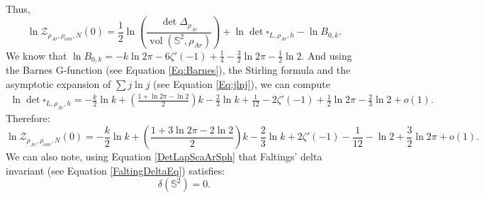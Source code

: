 \documentclass{article}
\theoremstyle{definition}
\theoremstyle{remark}
\DeclareMathOperator{\vol}{vol}
\begin{document}
Thus, \begin{equation}
    \ln \mathcal{Z}_{\rho_{Ar},\rho_{can},N}(0)=\frac{1}{2}\ln\left(\frac{\det \Delta_{\rho_{Ar}}}{\vol(\mathbb{S}^{2},\rho_{Ar})}\right)+\ln\det\square_{L,\rho_{Ar},h}-\ln B_{0,k}.
\end{equation}
We know that $\ln B_{0,k}=-k\ln2\pi -6\zeta'(-1)+\frac{1}{4}-\frac{3}{2}\ln2\pi-\frac{1}{2}\ln2.$
And using the Barnes G-function (see Equation \eqref{Eq:Barnes}), the Stirling formula and the asymptotic expansion of $\sum j\ln j$ (see Equation \eqref{Eq:jlnj}), we can compute 
\begin{align*}
    \ln \det\square_{L,\rho_{Ar},h}=-\frac{k}{2}\ln k +\left(\frac{1+\ln 2\pi-\ln2}{2} \right)k-\frac{2}{3}\ln k+\frac{1}{12}-2\zeta'(-1)+\frac{1}{2}\ln2\pi -\frac{2}{3}\ln2+o(1).
\end{align*}
Therefore: \begin{equation}
    \ln \mathcal{Z}_{\rho_{Ar},\rho_{can},N}(0)=-\frac{k}{2}\ln k+\left(\frac{1+3\ln2\pi-2\ln2}{2} \right)k-\frac{2}{3}\ln k+2\zeta'(-1)-\frac{1}{12}-\ln2+\frac{3}{2}\ln2\pi+o(1).
\end{equation}
We can also note, using Equation \eqref{DetLapScaArSph} that Faltings' delta invariant (see Equation \eqref{FaltingDeltaEq}) satisfies: \begin{equation}\label{Eq:FaltingSphere}\delta(\mathbb{S}^{2})=0. \end{equation}
\end{document}
